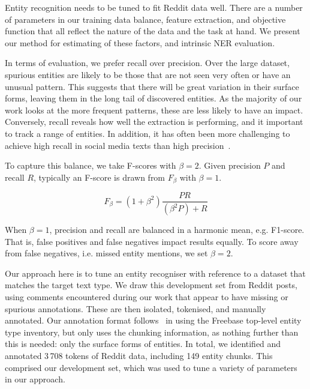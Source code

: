 \documentclass[journal,10pt,draftclsnofoot,onecolumn]{IEEEtran}
\begin{document}
Entity recognition needs to be tuned to fit Reddit data well.
There are a number of parameters in our training data balance, feature extraction, and objective function that all reflect the nature of the data and the task at hand.
We present our method for estimating of these factors, and intrinsic NER evaluation.

In terms of evaluation, we prefer recall over precision.
Over the large dataset, spurious entities are likely to be those that are not seen very often or have an unusual pattern.
This suggests that there will be great variation in their surface forms, leaving them in the long tail of discovered entities.
As the majority of our work looks at the more frequent patterns, these are less likely to have an impact.
Conversely, recall reveals how well the extraction is performing, and it important to track a range of entities.
In addition, it has often been more challenging to achieve high recall in social media texts than high precision~\cite{ritter2011named,derczynski2015analysis}.

To capture this balance, we take F-scores with $\beta=2$.
Given precision $P$ and recall $R$, typically an F-score is drawn from $F_\beta$ with $\beta=1$.

\begin{equation}
F_\beta = (1+\beta^2)\frac{PR}{(\beta^2 P) + R} 
\end{equation}

When $\beta=1$, precision and recall are balanced in a harmonic mean, e.g. F1-score.
That is, false positives and false negatives impact results equally.
To score away from false negatives, i.e. missed entity mentions, we set $\beta=2$.

Our approach here is to tune an entity recogniser with reference to a dataset that matches the target text type.
We draw this development set from Reddit posts, using comments encountered during our work that appear to have missing or spurious annotations.
These are then isolated, tokenised, and manually annotated.
Our annotation format follows~\cite{ritter2011named} in using the Freebase top-level entity type inventory, but only uses the chunking information, as nothing further than this is needed: only the surface forms of entities.
In total, we identified and annotated 3\,708 tokens of Reddit data, including 149 entity chunks.
This comprised our development set, which was used to tune a variety of parameters in our approach.
\end{document}

